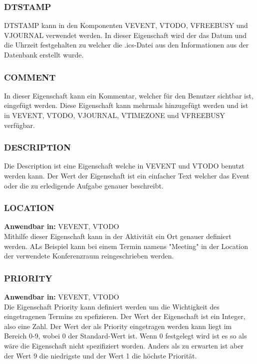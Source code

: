 \subsubsection{DTSTAMP}
\label{sec:dtstamp}
DTSTAMP kann in den Komponenten VEVENT, VTODO, VFREEBUSY und VJOURNAL verwendet werden. In dieser Eigenschaft wird der das Datum und die Uhrzeit festgehalten zu welcher die .ics-Datei aus den Informationen aus der Datenbank erstellt wurde.
\subsubsection{COMMENT}
\label{sec:comment}
In dieser Eigenschaft kann ein Kommentar, welcher für den Benutzer sichtbar ist, eingefügt werden. Diese Eigenschaft kann mehrmals hinzugefügt werden und ist in VEVENT, VTODO, VJOURNAL, VTIMEZONE und VFREEBUSY verfügbar.
\subsubsection{DESCRIPTION}
\label{sec:description}
Die Description ist eine Eigenschaft welche in VEVENT und VTODO benutzt werden kann. Der Wert der Eigenschaft ist ein einfacher Text welcher das Event oder die zu erledigende Aufgabe genauer beschreibt.  
\subsubsection{LOCATION}
\label{sec:location}
\textbf{Anwendbar in:} VEVENT, VTODO \\ %
Mithilfe dieser Eigenschaft kann in der Aktivität ein Ort genauer definiert werden. ALs Beispiel kann bei einem Termin namens "Meeting" in der Location der verwendete Konferenzraum reingeschrieben werden. 
\subsubsection{PRIORITY}
\label{sec:priority}
\textbf{Anwendbar in:} VEVENT, VTODO \\
Die Eigenschaft Priority kann definiert werden um die Wichtigkeit des eingetragenen Termins zu spefizieren. Der Wert der Eigenschaft ist ein Integer, also eine Zahl. Der Wert der als Priority eingetragen werden kann liegt im Bereich 0-9, wobei 0 der Standard-Wert ist. Wenn 0 festgelegt wird ist es so als wäre die Eigenschaft nicht spezifiziert worden. Anders als zu erwarten ist aber der Wert 9 die niedrigste und der Wert 1 die höchste Priorität. 
